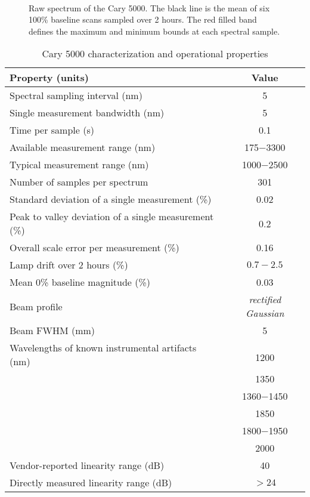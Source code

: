 \begin{figure}[h!] 
\begin{center}
\ 
\caption[Cary 5000 raw spectrum]{Raw spectrum of the Cary 5000.  The black line is the mean of six 100\% baseline scans sampled over 2 hours.  The red filled band defines the maximum and minimum bounds at each spectral sample.}
\label{fig:Cary5000baseline}
\end{center}
\end{figure}


\begin{longtable}{lc}
    \caption[Cary 5000 Characterization]{Cary 5000 characterization and operational properties} \label{tab:C5000Char} \\

    \hline
     Property (units) & Value \\ 
    \hline
       Spectral sampling interval (nm) & 5 \\
       Single measurement bandwidth (nm) & 5 \\
       Time per sample (s) & 0.1 \\
       Available measurement range (nm) & 175$-$3300 \\
       Typical measurement range (nm) & 1000$-$2500 \\
       Number of samples per spectrum & 301 \\
	Standard deviation of a single measurement (\%) & 0.02 \\
	Peak to valley deviation of a single measurement (\%) & 0.2 \\
	Overall scale error per measurement (\%) & 0.16 \\
	Lamp drift over 2 hours (\%) & $0.7-2.5$ \\
	Mean 0\% baseline magnitude (\%) & 0.03 \\
	Beam profile & \emph{rectified Gaussian} \\
	Beam FWHM (mm) & 5 \\
	\multirow{2}{*}{Wavelengths of known instrumental artifacts (nm)} &  \\
      &1200 \\
      &1350 \\
      &1360$-$1450\\
      &1850 \\
      &1800$-$1950 \\
      &2000 \\
      Vendor-reported linearity range (dB) & 40 \\
      Directly measured linearity range (dB) & $>24$ \\
    \hline
\end{longtable}

